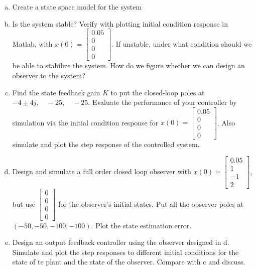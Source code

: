 \documentclass{article}
\begin{document}
\begin{enumerate}[a.]
\item Create a state space model for the system
\newline

\item Is the system stable?
Verify with plotting initial condition response in Matlab, with $x(0) = \begin{bmatrix} 0.05 \\ 0 \\ 0 \\ 0 \end{bmatrix}$.
If unstable, under what condition should we be able to stabilize the system.
How do we figure whether we can design an observer to the system?
\newline

\item Find the state feedback gain $K$ to put the closed-loop poles at $ -4 \pm 4j,\quad -25,\quad -25$.
Evaluate the performance of your controller by simulation via the initial condition response for $x(0) = \begin{bmatrix} 0.05 \\ 0 \\ 0 \\ 0 \end{bmatrix}$.
Also simulate and plot the step response of the controlled system.
\newline

\item Design and simulate a full order closed loop observer with $x(0) = \begin{bmatrix} 0.05 \\ 1 \\ -1 \\ 2 \end{bmatrix}$, but use $\begin{bmatrix} 0 \\ 0 \\ 0 \\ 0 \end{bmatrix}$ for the observer's initial states.
Put all the observer poles at $ (-50, -50, -100, -100)$.
Plot the state estimation error.
\newline

\item Design an output feedback controller using the observer designed in d.
Simulate and plot the step responses to different initial conditions for the state of te plant and the state of the observer.
Compare with c and discuss.
\newline

\end{enumerate}
\end{document}
